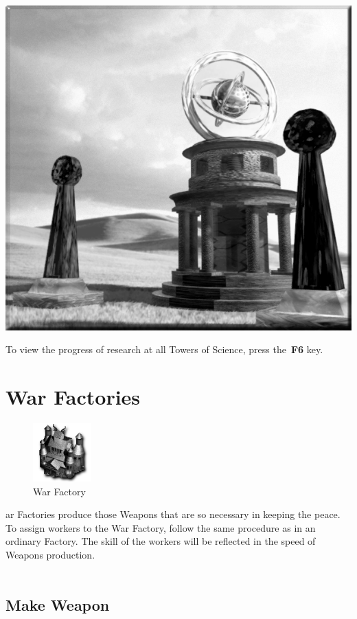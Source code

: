 \begin{center}
	\includegraphics[width=0.7\linewidth]{Atower}
\end{center}

To view the progress of research at all Towers of Science, press the \textbf{F6} key.

\section{War Factories}

\begin{figure}
	\vspace{-20pt}
	\begin{center}
		\includegraphics[width=0.2\textwidth]{Iwarfactory}
		\\ War Factory
	\end{center}
	\vspace{-20pt}
\end{figure}

ar Factories produce those Weapons that are so necessary in keeping the peace. To assign workers to the War Factory, follow the same procedure as in an ordinary Factory. The skill of the workers will be reflected in the speed of Weapons production. \\ \\

\subsection{Make Weapon}

